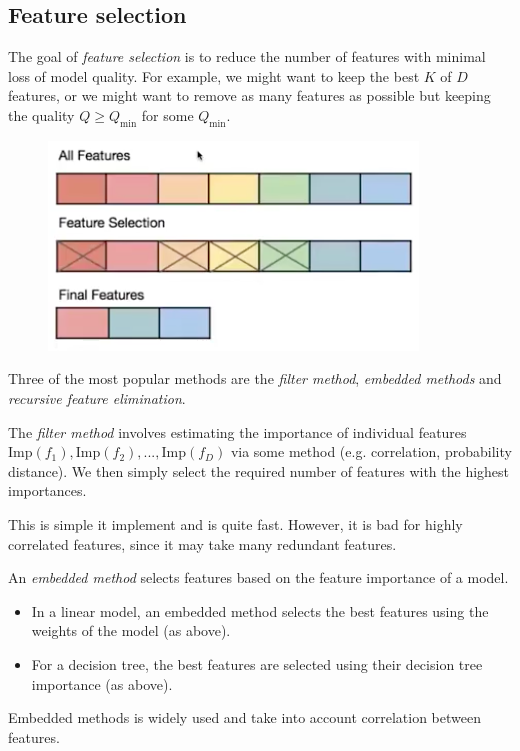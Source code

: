 \subsection{Feature selection}
The goal of \textit{feature selection} is to reduce the number of features with minimal loss of model quality. For example, we might want to keep the best $K$ of $D$ features, or we might want to remove as many features as possible but keeping the quality $Q \geq Q_{\text{min}}$ for some $Q_{\text{min}}$. 
\begin{figure}[H]
\centering
\includegraphics[scale=0.3]{featureselection.png}
\end{figure}

Three of the most popular methods are the \textit{filter method}, \textit{embedded methods} and \textit{recursive feature elimination}.

\begin{framedef}
The \textit{filter method} involves estimating the importance of individual features $\textrm{Imp}(f_1), \textrm{Imp}(f_2), ..., \textrm{Imp}(f_D)$ via some method (e.g. correlation, probability distance). We then simply select the required number of features with the highest importances.
\end{framedef}

This is simple it implement and is quite fast. However, it is bad for highly correlated features, since it may take many redundant features.

\begin{framedef}
An \textit{embedded method} selects features based on the feature importance of a model.
\begin{itemize}
\item In a linear model, an embedded method selects the best features using the weights of the model (as above).
\item For a decision tree, the best features are selected using their decision tree importance (as above).
\end{itemize}
\end{framedef}
Embedded methods is widely used and take into account correlation between features.\\

